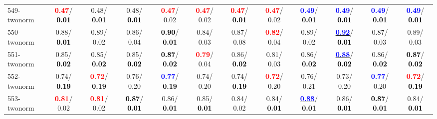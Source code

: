 \begin{table}[h]
\begin{center}
{\begin{tabular}{lc|c|c|c|c|c|c|c|c|c|c}
549-twonorm & \textcolor{red}{\textbf{  0.47}}/\textcolor{black}{\textbf{  0.01}} &   0.48/\textcolor{black}{\textbf{  0.01}} &   0.48/\textcolor{black}{\textbf{  0.01}} & \textcolor{red}{\textbf{  0.47}}/  0.02 & \textcolor{red}{\textbf{  0.47}}/  0.02 & \textcolor{red}{\textbf{  0.47}}/\textcolor{black}{\textbf{  0.01}} & \textcolor{red}{\textbf{  0.47}}/  0.02 & \textcolor{blue}{\textbf{  0.49}}/\textcolor{black}{\textbf{  0.01}} & \textcolor{blue}{\textbf{  0.49}}/\textcolor{black}{\textbf{  0.01}} & \textcolor{blue}{\textbf{  0.49}}/\textcolor{black}{\textbf{  0.01}} & \textcolor{blue}{\textbf{  0.49}}/\textcolor{black}{\textbf{  0.01}} \\
550-twonorm &   0.88/\textcolor{black}{\textbf{  0.01}} &   0.89/  0.02 &   0.86/  0.04 & \textcolor{black}{\textbf{  0.90}}/\textcolor{black}{\textbf{  0.01}} &   0.84/  0.03 &   0.87/  0.08 & \textcolor{red}{\textbf{  0.82}}/  0.04 &   0.89/  0.02 & \underline{\textcolor{blue}{\textbf{  0.92}}}/\textcolor{black}{\textbf{  0.01}} &   0.87/  0.03 &   0.89/  0.03 \\
551-twonorm &   0.85/\textcolor{black}{\textbf{  0.02}} &   0.85/\textcolor{black}{\textbf{  0.02}} &   0.85/\textcolor{black}{\textbf{  0.02}} & \textcolor{black}{\textbf{  0.87}}/\textcolor{black}{\textbf{  0.02}} & \textcolor{red}{\textbf{  0.79}}/  0.04 &   0.86/\textcolor{black}{\textbf{  0.02}} &   0.81/  0.03 &   0.86/\textcolor{black}{\textbf{  0.02}} & \underline{\textcolor{blue}{\textbf{  0.88}}}/\textcolor{black}{\textbf{  0.02}} &   0.86/\textcolor{black}{\textbf{  0.02}} & \textcolor{black}{\textbf{  0.87}}/\textcolor{black}{\textbf{  0.02}} \\ \hline
552-twonorm &   0.74/\textcolor{black}{\textbf{  0.19}} & \textcolor{red}{\textbf{  0.72}}/\textcolor{black}{\textbf{  0.19}} &   0.76/  0.20 & \textcolor{blue}{\textbf{  0.77}}/\textcolor{black}{\textbf{  0.19}} &   0.74/  0.20 &   0.74/\textcolor{black}{\textbf{  0.19}} & \textcolor{red}{\textbf{  0.72}}/  0.20 &   0.76/  0.21 &   0.73/  0.20 & \textcolor{blue}{\textbf{  0.77}}/  0.20 & \textcolor{red}{\textbf{  0.72}}/\textcolor{black}{\textbf{  0.19}} \\
553-twonorm & \textcolor{red}{\textbf{  0.81}}/  0.02 & \textcolor{red}{\textbf{  0.81}}/  0.02 & \textcolor{black}{\textbf{  0.87}}/\textcolor{black}{\textbf{  0.01}} &   0.86/\textcolor{black}{\textbf{  0.01}} &   0.85/\textcolor{black}{\textbf{  0.01}} &   0.84/  0.02 &   0.84/\textcolor{black}{\textbf{  0.01}} & \underline{\textcolor{blue}{\textbf{  0.88}}}/\textcolor{black}{\textbf{  0.01}} &   0.86/\textcolor{black}{\textbf{  0.01}} & \textcolor{black}{\textbf{  0.87}}/\textcolor{black}{\textbf{  0.01}} &   0.84/\textcolor{black}{\textbf{  0.01}} \\

\end{tabular}}
\end{center}
\end{table}
